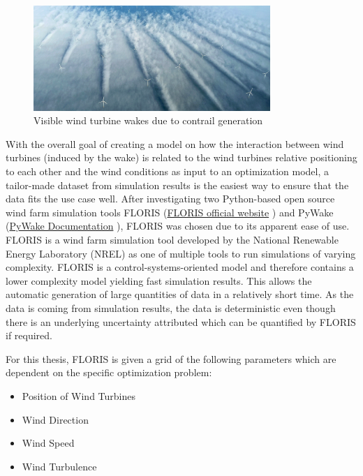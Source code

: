 \begin{figure}[h] 
	\centering
	\includegraphics[width=0.8\textwidth]{../figures/introduction/wake_photo.png} 
	\caption{Visible wind turbine wakes due to contrail generation \cite{windpowermonthly_offshore_clusters}}
	\label{fig:wake_photo}
\end{figure}


With the overall goal of creating a model on how the interaction between wind turbines (induced by the wake) is related to the wind turbines relative positioning to each other and the wind conditions as input to an optimization model, a tailor-made dataset from simulation results is the easiest way to ensure that the data fits the use case well. After investigating two Python-based open source wind farm simulation tools FLORIS (\href{https://www.nrel.gov/wind/floris}{FLORIS official website} \cite{nrel_floris_web}) and PyWake (\href{https://topfarm.pages.windenergy.dtu.dk/PyWake/}{PyWake Documentation} \cite{dtu_pywake_2025}), FLORIS was chosen due to its apparent ease of use. FLORIS is a wind farm simulation tool developed by the National Renewable Energy Laboratory (NREL) as one of multiple tools to run simulations of varying complexity. FLORIS is a control-systems-oriented model and therefore contains a lower complexity model yielding fast simulation results. This allows the automatic generation of large quantities of data in a relatively short time. As the data is coming from  simulation results, the data is deterministic even though there is an underlying uncertainty attributed which can be quantified by FLORIS if required. 

For this thesis, FLORIS is given a grid of the following parameters which are dependent on the specific optimization problem:

\begin{itemize}
	\item Position of Wind Turbines
	\item Wind Direction
	\item Wind Speed
	\item Wind Turbulence
\end{itemize}

